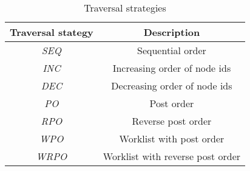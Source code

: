 \begin{table}[ht!]
\caption{Traversal strategies}
\label{tab:strategies}
\begin{tabular}{c|c}
Traversal stategy & Description \\\hline\hline
\textit{SEQ} & Sequential order \\\hline
\textit{INC} & Increasing order of node ids \\\hline
\textit{DEC} & Decreasing order of node ids \\\hline 
\textit{PO} & Post order \\\hline
\textit{RPO} & Reverse post order \\\hline 
\textit{WPO} & Worklist with post order \\\hline
\textit{WRPO} & Worklist with reverse post order \\\hline
\end{tabular}
\end{table}